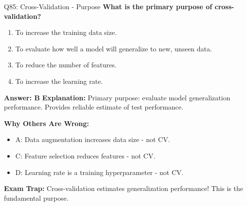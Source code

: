 \documentclass[8pt]{beamer}
\begin{document}
	\begin{frame}{Q85: Cross-Validation - Purpose}
		\fontsize{6.5}{7.5}\selectfont
		\textbf{What is the primary purpose of cross-validation?}
		
		\begin{enumerate}
			\item To increase the training data size.
			\item To evaluate how well a model will generalize to new, unseen data.
			\item To reduce the number of features.
			\item To increase the learning rate.
		\end{enumerate}
		
		\vspace{0.05cm}
		\textcolor{myblue}{\textbf{Answer: B}}
		\vspace{0.05cm}
		\textcolor{myblue}{\textbf{Explanation:}} Primary purpose: evaluate model generalization performance. Provides reliable estimate of test performance.
		
		\vspace{0.05cm}
		\textcolor{myred}{\textbf{Why Others Are Wrong:}}
		\begin{itemize}
			\item \textcolor{myred}{A:} Data augmentation increases data size - not CV.
			\item \textcolor{myred}{C:} Feature selection reduces features - not CV.
			\item \textcolor{myred}{D:} Learning rate is a training hyperparameter - not CV.
		\end{itemize}
		
		\textcolor{myred}{\textbf{Exam Trap:}} Cross-validation estimates \textcolor{myblue}{generalization performance}! This is the fundamental purpose.
	\end{frame}
	
\end{document}
